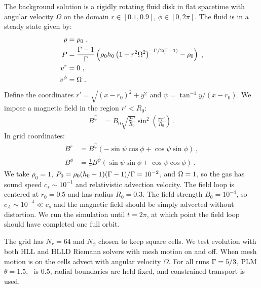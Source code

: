 The background solution is a rigidly rotating fluid disk in flat spacetime with angular velocity $\Omega$ on the domain $r\in[0.1,0.9]$, $\phi\in[0,2\pi]$.  The fluid is in a steady state given by:
\begin{align}
	\rho &= \rho_0 \ ,\\
	P &= \frac{\Gamma-1}{\Gamma}\left(\rho_0 h_0\left(1-r^2\Omega^2\right)^{-\Gamma / 2(\Gamma-1)} - \rho_0\right)\ ,\\
	v^r &= 0 \ ,\\
	v^\phi &= \Omega\ .
\end{align}
Define the coordinates $r' = \sqrt{(x-r_0)^2 + y^2}$ and $\psi = \tan^{-1} y/(x-r_0)$.  We impose a magnetic field in the region $r' < R_0$:
\begin{align}
	B^{\widehat{\psi}} &= B_0 \sqrt{\frac{2 r'}{R_0}} \sin^2\left(\frac{\pi r'}{R_0}\right)\ .
\end{align}
In grid coordinates:
\begin{align}
	B^r &= B^{\widehat{\psi}}\left( -\sin \psi \cos \phi + \cos \psi \sin \phi\right)\ , \\
	B^\phi &= \frac{1}{r} B^{\widehat{\psi}}\left( \sin \psi \sin \phi + \cos \psi \cos \phi\right) \ .
\end{align}
We take $\rho_0 = 1$, $P_0 = \rho_0 (h_0 - 1)(\Gamma-1)/\Gamma = 10^{-2}$, and $\Omega=1$, so the gas has sound speed $c_s \sim 10^{-1}$ and relativistic advection velocity.  The field loop is centered at $r_0 = 0.5$ and has radius $R_0 = 0.3$.  The field strength $B_0 = 10^{-4}$, so $c_A \sim 10^{-4} \ll c_s$ and the magnetic field should be simply advected without distortion.  We run the simulation until $t = 2\pi$, at which point the field loop should have completed one full orbit.

The grid has $N_r = 64$ and $N_\phi$ chosen to keep square cells. We test evolution with both HLL and HLLD Riemann solvers with mesh motion on and off.  When mesh motion is on the cells advect with angular velocity $\Omega$.  For all runs $\Gamma=5/3$, PLM $\theta =1.5$, \CFL\ is 0.5, radial boundaries are held fixed, and constrained transport is used.

